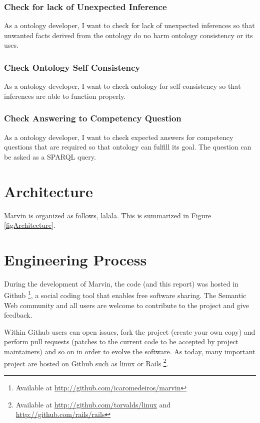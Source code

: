 \documentclass{report}
\begin{document}
\subsubsection{Check for lack of Unexpected Inference}

As a ontology developer, I want to check for lack of unexpected inferences so that unwanted facts
derived from the ontology do no harm ontology consistency or its uses.

\subsubsection{Check Ontology Self Consistency}

As a ontology developer, I want to check ontology for self consistency so that inferences are able to
function properly.

\subsubsection{Check Answering to Competency Question}

As a ontology developer, I want to check expected answers for competency questions that are required
so that ontology can fulfill its goal. The question can be asked as a SPARQL query.

\section{Architecture}

Marvin is organized as follows, lalala. This is summarized in Figure \ref{figArchitecture}.


\section{Engineering Process}

During the development of Marvin, the code (and this report) was hosted in Github
\footnote{Available at \url{http://github.com/icaromedeiros/marvin}}, a social coding tool that enables free software
sharing. The Semantic Web community and all users are welcome to contribute to the project and give feedback.

Within Github users can open issues, fork the project (create your own copy) and perform pull requests (patches to the
current code to be accepted by project maintainers) and so on in order to evolve the software. As today, many
important project are hosted on Github such as linux or Rails \footnote{Available at \url{http://github.com/torvalds/linux}
and \url{http://github.com/rails/rails}}.
\end{document}
